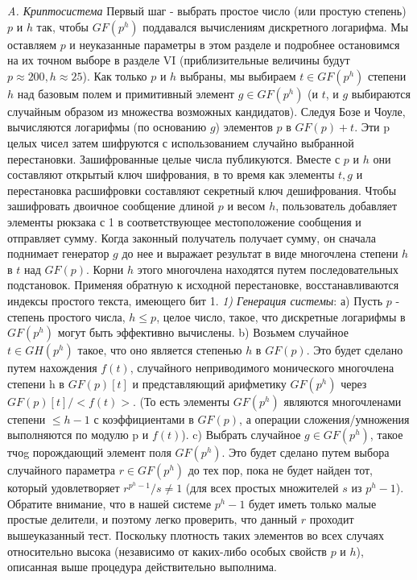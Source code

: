 \documentclass[a4paper,12pt]{article}
\newcommand{\DL}{\newline\newline}
\begin{document}
\textsl{A. Криптосистема}
\DL
Первый шаг - выбрать простое число (или простую степень) $p$ и $h$ так, чтобы $GF(p^h)$  поддавался вычислениям дискретного логарифма. Мы оставляем $p$ и неуказанные параметры в этом разделе и подробнее остановимся на их точном выборе в разделе VI (приблизительные величины будут $p \approx 200, h \approx 25$). Как только $p$ и $h$ выбраны, мы выбираем $t \in GF(p^h)$ степени $h$ над базовым полем и примитивный элемент $g \in GF(p^h)$ (и $t$, и $g$ выбираются случайным образом из множества возможных кандидатов). Следуя Бозе и Чоуле, вычисляются логарифмы (по основанию $g$) элементов $p$ в $GF(p)+t$. Эти p целых чисел затем шифруются с использованием случайно выбранной перестановки. Зашифрованные целые числа публикуются. Вместе с $p$ и $h$ они составляют открытый ключ шифрования, в то время как элементы $t, g$ и перестановка расшифровки составляют секретный ключ дешифрования. Чтобы зашифровать двоичное сообщение длиной $p$ и весом $h$, пользователь добавляет элементы рюкзака с 1 в соответствующее местоположение сообщения и отправляет сумму. Когда законный получатель получает сумму, он сначала поднимает генератор $g$ до нее и выражает результат в виде многочлена степени $h$ в $t$ над $GF(p)$. Корни $h$ этого многочлена находятся путем последовательных подстановок. Применяя обратную к исходной перестановке, восстанавливаются индексы простого текста, имеющего бит 1. \newline
\textsl {1) Генерация системы}: а) Пусть $p$ - степень простого числа, $h\leq p$, целое число, такое, что дискретные логарифмы в $GF(p^h)$ могут быть эффективно вычислены. \newline
\indent b) Возьмем случайное $t \in GH(p^h)$ такое, что оно является степенью $h$ в $GF(p)$. Это будет сделано путем нахождения $f(t)$, случайного неприводимого монического многочлена степени h в $GF(p)[t]$ и представляющий арифметику $GF(p^h)$ через $GF(p)[t]/<f(t)>$. (То есть элементы $GF(p^h)$ являются многочленами степени $\leq h - 1$ с коэффициентами в $GF(p)$, а операции сложения/умножения выполняются по модулю p и $f(t)$).\newline
\indent c) Выбрать случайное $g \in GF(p^h)$, такое тчоg порождающий элемент поля $GF(p^h)$. Это будет сделано путем выбора случайного параметра $r \in GF(p^h)$ до тех пор, пока не будет найден тот, который удовлетворяет $r^{p^h-1}/s \neq 1$ (для всех простых множителей $s$ из $p^h-1$). Обратите внимание, что в нашей системе $p^h -1$ будет иметь только малые простые делители, и поэтому легко проверить, что данный $r$ проходит вышеуказанный тест. Поскольку плотность таких элементов во всех случаях относительно высока (независимо от каких-либо особых свойств $p$ и $h$), описанная выше процедура действительно выполнима. \newline
\end{document}
